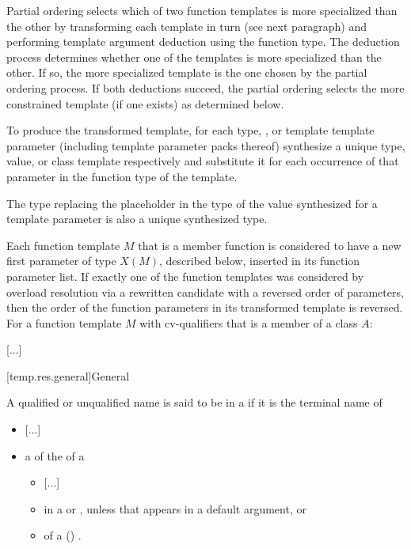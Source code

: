 \documentclass{wg21}
\begin{document}
\pnum
Partial ordering selects which of two function templates is more
specialized than the other by transforming each template in turn
(see next paragraph) and performing template argument deduction
using the function type.
The deduction process determines whether
one of the templates is more specialized than the other. If so, the
more specialized template is the one chosen by the partial ordering
process.
If both deductions succeed, the partial ordering selects
the more constrained template (if one exists) as determined below.

\pnum
To produce the transformed template, for each type, , or template
template parameter (including template parameter packs 
thereof) synthesize a unique type, value, or class template
respectively and substitute it for each occurrence of that parameter
in the function type of the template.



\begin{note}
    The type replacing the placeholder
    in the type of the value synthesized for a  template parameter
    is also a unique synthesized type.
\end{note}
Each function template $M$ that is a member function
is considered to have
a new first parameter of type $X(M)$, described below,
inserted in its function parameter list.
If exactly one of the function templates was considered by overload resolution
via a rewritten candidate 
with a reversed order of parameters,
then the order of the function parameters in its transformed template
is reversed.
For a function template $M$ with cv-qualifiers \cv{}
that is a member of a class $A$:

\textcolor{noteclr}{[...]}

[temp.res.general]{General}


%
A qualified or unqualified name is said to be in
a 
if it is the terminal name of
\begin{itemize}
\item \textcolor{noteclr}{[...]}
\item a  of the  of a
\begin{itemize}
    \item \textcolor{noteclr}{[...]}
    \item {} in a 
    or ,
    unless that  appears in a default argument, or
    \item {} of a () .
\end{itemize}
\end{itemize}
\end{document}
